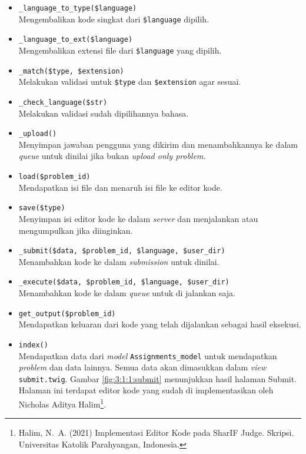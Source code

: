 \documentclass[a4paper,twoside]{article}
\begin{document}
\begin{enumerate}
\begin{itemize}
\begin{itemize}
			                  \begin{itemize}
				                  \item \verb|_language_to_type($language)| \\
				                        Mengembalikan kode singkat dari \verb|$language| dipilih.
				                  \item \verb|_language_to_ext($language)| \\
				                        Mengembalikan extensi file dari \verb|$language| yang dipilih.
				                  \item \verb|_match($type, $extension)| \\
				                        Melakukan validasi untuk \verb|$type| dan \verb|$extension| agar sesuai.
				                  \item \verb|_check_language($str)| \\
				                        Melakukan validasi sudah dipilihannya bahasa.
				                  \item \verb|_upload()| \\
				                        Menyimpan jawaban pengguna yang dikirim dan menambahkannya ke dalam \textit{queue} untuk dinilai jika bukan \textit{upload only problem}.
				                  \item \verb|load($problem_id)| \\
				                        Mendapatkan isi file dan menaruh isi file ke editor kode.
				                  \item \verb|save($type)| \\
				                        Menyimpan isi editor kode ke dalam \textit{server} dan menjalankan atau mengumpulkan jika diinginkan.
				                  \item \verb|_submit($data, $problem_id, $language, $user_dir)| \\
				                        Menambahkan kode ke dalam \textit{submission} untuk dinilai.
				                  \item \verb|_execute($data, $problem_id, $language, $user_dir)| \\
				                        Menambahkan kode ke dalam \textit{queue} untuk di jalankan saja.
				                  \item \verb|get_output($problem_id)| \\
				                        Mendapatkan keluaran dari kode yang telah dijalankan sebagai hasil eksekusi.
				                  \item \verb|index()| \\
				                        Mendapatkan data dari \textit{model} \verb|Assignments_model| untuk mendapatkan \textit{problem} dan data lainnya. Semua data akan dimasukkan dalam \textit{view} \verb|submit.twig|. Gambar \ref{fig:3:1:1:submit} menunjukkan hasil halaman Submit. Halaman ini terdapat editor kode yang sudah di implementasikan oleh Nicholas Aditya Halim\footnote{Halim, N.~A. (2021) {Implementasi Editor Kode pada SharIF Judge}. Skripsi. Universitas Katolik Parahyangan,  Indonesia.}.


\end{itemize}
\end{itemize}
\end{itemize}
\end{enumerate}
\end{document}
